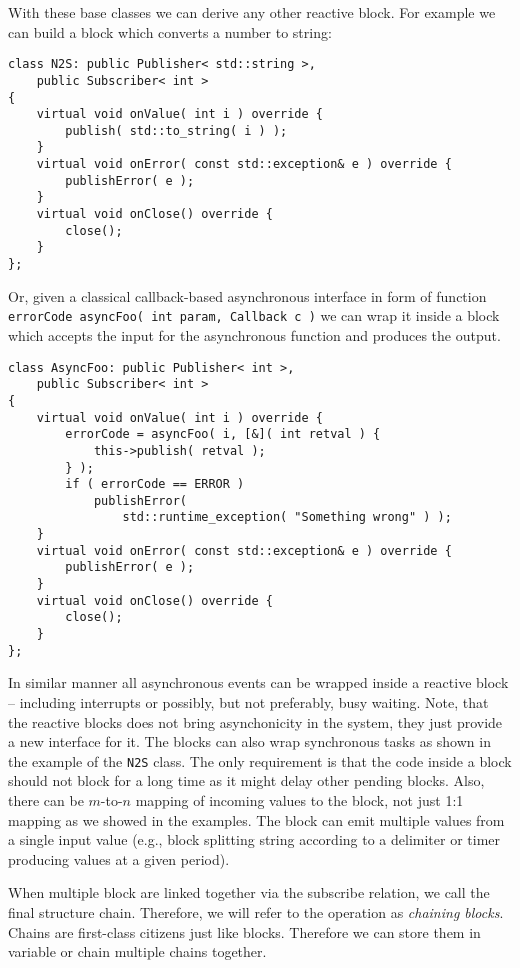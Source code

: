 With these base classes we can derive any other reactive block. For example we
can build a block which converts a number to string:
\begin{verbatim}
class N2S: public Publisher< std::string >,
    public Subscriber< int >
{
    virtual void onValue( int i ) override {
        publish( std::to_string( i ) );
    }
    virtual void onError( const std::exception& e ) override {
        publishError( e );
    }
    virtual void onClose() override {
        close();
    }
};
\end{verbatim}

Or, given a classical callback-based asynchronous interface in form of function
\texttt{errorCode asyncFoo( int param, Callback c )} we can
wrap it inside a block which accepts the input for the asynchronous function and
produces the output.
\begin{verbatim}
class AsyncFoo: public Publisher< int >,
    public Subscriber< int >
{
    virtual void onValue( int i ) override {
        errorCode = asyncFoo( i, [&]( int retval ) {
            this->publish( retval );
        } );
        if ( errorCode == ERROR )
            publishError(
                std::runtime_exception( "Something wrong" ) );
    }
    virtual void onError( const std::exception& e ) override {
        publishError( e );
    }
    virtual void onClose() override {
        close();
    }
};
\end{verbatim}

In similar manner all asynchronous events can be wrapped inside a reactive block
-- including interrupts or possibly, but not preferably, busy waiting. Note,
that the reactive blocks does not bring asynchonicity in the system, they just
provide a new interface for it. The blocks can also wrap synchronous tasks as
shown in the example of the \texttt{N2S} class. The only requirement is that the
code inside a block should not block for a long time as it might delay other
pending blocks. Also, there can be $m$-to-$n$ mapping of incoming values to the
block, not just 1:1 mapping as we showed in the examples. The block can emit
multiple values from a single input value (e.g., block splitting string
according to a delimiter or timer producing values at a given period).

When multiple block are linked together via the subscribe relation, we call the
final structure chain. Therefore, we will refer to the operation as
\emph{chaining blocks}. Chains are first-class citizens just like blocks.
Therefore we can store them in variable or chain multiple chains together.


